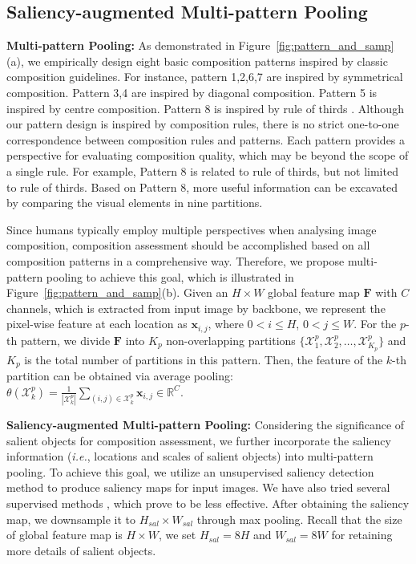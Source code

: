 \documentclass{bmvc2k}
\begin{document}
\subsection{Saliency-augmented Multi-pattern Pooling}

\noindent\textbf{Multi-pattern Pooling:} As demonstrated in Figure~\ref{fig:pattern_and_samp}(a), we empirically design eight basic composition patterns inspired by classic composition guidelines. \textcolor[rgb]{0,0,0}{For instance, pattern 1,2,6,7 are inspired by symmetrical composition.
Pattern 3,4 are inspired by diagonal composition.
Pattern 5 is inspired by centre composition.
Pattern 8 is inspired by rule of thirds \cite{thommes2018instagram,Lee2018PhotographicCC}.
Although our pattern design is inspired by composition rules, there is no strict one-to-one correspondence between composition rules and patterns. Each pattern provides a perspective for evaluating composition quality, which may be beyond the scope of a single rule.  For example, Pattern 8 is related to rule of thirds, but not limited to rule of thirds. Based on Pattern 8, more useful information can be excavated by comparing the visual elements in nine partitions.}


Since humans typically employ multiple perspectives when analysing image composition, composition assessment should be accomplished based on all composition patterns in a comprehensive way.
Therefore, we propose multi-pattern pooling to achieve this goal, which is illustrated in Figure~\ref{fig:pattern_and_samp}(b). Given an $H \times W$ global feature map $\mathbf{F}$ with $C$ channels, which is extracted from input image by backbone, we represent the pixel-wise feature at each location as $\mathbf{x}_{i,j}$, where $0 < i \leq H$, $0 < j \leq W$. For the $p$-th pattern, we divide $\mathbf{F}$ into $K_p$ non-overlapping partitions $\{\mathcal{X}^p_1, \mathcal{X}^p_2, \ldots, \mathcal{X}^p_{K_p} \}$ and $K_p$ is the total number of partitions in this pattern. Then, the feature of the $k$-th partition can be obtained via average pooling: $\theta(\mathcal{X}^p_k) = \frac{1}{| \mathcal{X}^p_k |} \sum_{ (i,j) \in \mathcal{X}^p_k} \mathbf{x}_{i,j}\in \mathbb{R}^{C}$.



\noindent\textbf{Saliency-augmented Multi-pattern Pooling:} 
Considering the significance of salient objects for composition assessment, we further incorporate the saliency information (\emph{i.e.}, locations and scales of salient objects) into multi-pattern pooling. 
To achieve this goal, we utilize an unsupervised saliency detection method \cite{Hou2007SaliencyDA} to produce saliency maps for input images. We have also tried several supervised methods \cite{hou2017deeply,cornia2018predicting,Zhao_2019_CVPR}, which prove to be less effective. 
After obtaining the saliency map, we downsample it to $H_{sal} \times W_{sal}$ through max pooling. Recall that the size of global feature map is $H \times W$, we set $H_{sal} = 8H$ and $W_{sal} = 8W$ for retaining more details of salient objects. 
\end{document}

